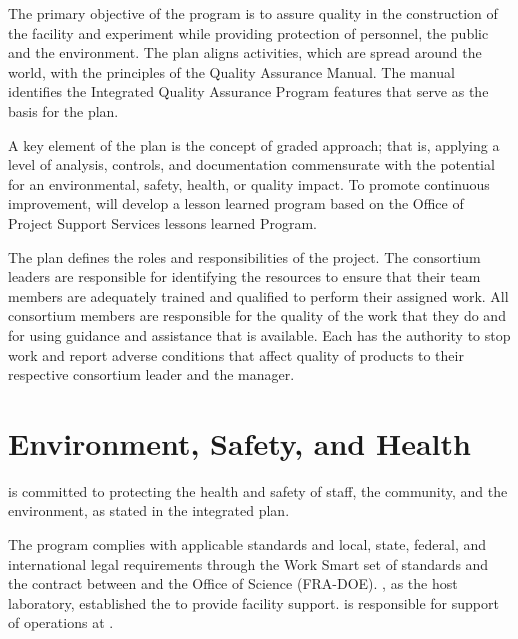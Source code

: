 The primary objective of the   program is
to assure quality in the construction of the  facility and
 experiment while providing protection of
 personnel, the public and the environment. The
 plan aligns   activities, which
are spread around the world, with the principles of the \fnal Quality
Assurance Manual. The manual identifies the \fnal Integrated Quality
Assurance Program features that serve as the basis for the
  plan.

A key element of the   plan is the
concept of graded approach; that is, applying a level of analysis,
controls, and documentation commensurate with the potential for an
environmental, safety, health, or quality impact. To promote continuous improvement,   will develop a
lesson learned program based on the \fnal Office of Project Support
Services lessons learned Program.


The  plan
defines the  roles and responsibilities of the 
project. The  consortium leaders are responsible for identifying the
resources to ensure that their team members are adequately trained and
qualified to perform their assigned work.
All consortium members are responsible for the quality of the work that
they do and for using guidance and assistance that is available. Each
has the authority to stop work and report adverse conditions that
affect quality of  products to their respective
 consortium leader and the 
 manager.




\section{Environment, Safety, and Health}
\label{sec:es-tc-eshq}

 is committed to protecting the health and safety of
staff, the community, and the environment, as stated in the
 integrated  plan.

The   program complies with applicable
standards and local, state, federal, and international legal
requirements through the  Work Smart set of standards and the
contract between  and the 
Office of Science (FRA-DOE). \fnal, as the host laboratory,
established the  to provide facility support.
 is responsible for support of 
operations at .

